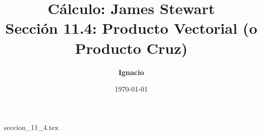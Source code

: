 \documentclass[11pt,spanish,oneside]{report}
\title{\textbf{Cálculo: James Stewart} \\ \Large Sección 11.4: Producto Vectorial (o Producto Cruz)}
\author{\textbf{Ignacio}}
\date{\today}
\begin{document}
\maketitle

{seccion_11_4.tex}
\end{document}

